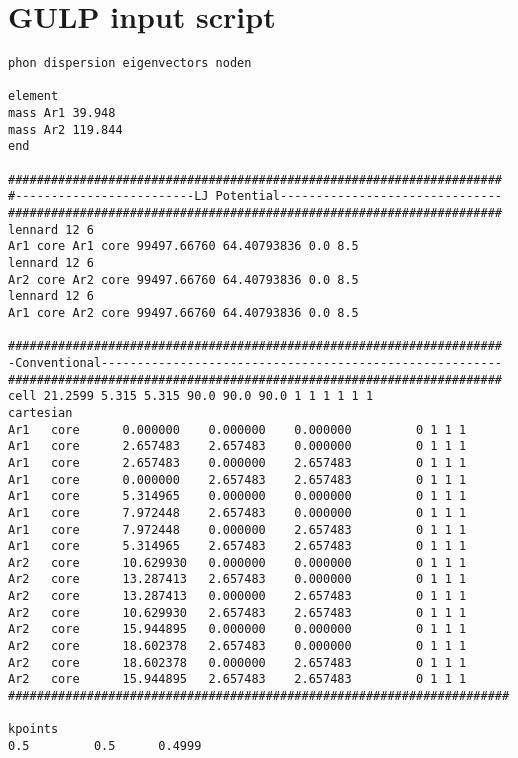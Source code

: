 \chapter{GULP input script}

\begin{singlespace}
\begin{verbatim}
phon dispersion eigenvectors noden 

element 
mass Ar1 39.948 
mass Ar2 119.844 
end

#####################################################################
#-------------------------LJ Potential-------------------------------
#####################################################################
lennard 12 6 
Ar1 core Ar1 core 99497.66760 64.40793836 0.0 8.5
lennard 12 6 
Ar2 core Ar2 core 99497.66760 64.40793836 0.0 8.5
lennard 12 6 
Ar1 core Ar2 core 99497.66760 64.40793836 0.0 8.5

#####################################################################
-Conventional--------------------------------------------------------
#####################################################################
cell 21.2599 5.315 5.315 90.0 90.0 90.0 1 1 1 1 1 1
cartesian
Ar1   core     	0.000000	0.000000	0.000000	     0 1 1 1 
Ar1   core     	2.657483	2.657483	0.000000	     0 1 1 1 
Ar1   core     	2.657483	0.000000	2.657483	     0 1 1 1 
Ar1   core     	0.000000	2.657483	2.657483	     0 1 1 1 
Ar1   core     	5.314965	0.000000	0.000000	     0 1 1 1 
Ar1   core     	7.972448	2.657483	0.000000	     0 1 1 1 
Ar1   core     	7.972448	0.000000	2.657483	     0 1 1 1 
Ar1   core     	5.314965	2.657483	2.657483	     0 1 1 1 
Ar2   core    	10.629930	0.000000	0.000000	     0 1 1 1 
Ar2   core    	13.287413	2.657483	0.000000	     0 1 1 1 
Ar2   core    	13.287413	0.000000	2.657483	     0 1 1 1 
Ar2   core    	10.629930	2.657483	2.657483	     0 1 1 1 
Ar2   core    	15.944895	0.000000	0.000000	     0 1 1 1 
Ar2   core    	18.602378	2.657483	0.000000	     0 1 1 1 
Ar2   core    	18.602378	0.000000	2.657483	     0 1 1 1 
Ar2   core    	15.944895	2.657483	2.657483	     0 1 1 1 
######################################################################

kpoints
0.5         0.5      0.4999
\end{verbatim}
\end{singlespace}
